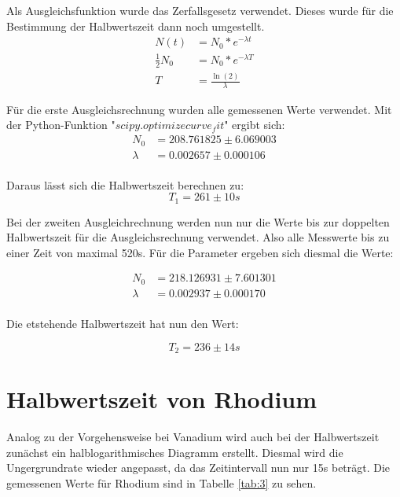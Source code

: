 \documentclass[titlepage=firstcover, captions=tableheading]{scrartcl}
\begin{document}
\noindent Als Ausgleichsfunktion wurde das Zerfallsgesetz verwendet.
Dieses wurde für die Bestimmung der Halbwertszeit dann noch umgestellt.
\begin{align}
    N(t) &= N_0 * e^{-\lambda t} \nonumber \\
    \frac{1}{2} N_0 &= N_0 * e^{-\lambda T} \nonumber \\
    T &= \frac{\ln(2)}{\lambda} \nonumber
\end{align}

\noindent Für die erste Ausgleichsrechnung wurden alle gemessenen Werte verwendet.
Mit der Python-Funktion "$scipy.optimize curve_fit$" ergibt sich:
\begin{align}
    N_0 &=  208.761825 \pm 6.069003 \nonumber \\
    \lambda &= 0.002657 \pm 0.000106 \nonumber\\ 
\end{align}

Daraus lässt sich die Halbwertszeit berechnen zu:
\begin{displaymath}
    T_1 = 261 \pm 10 s 
\end{displaymath}

Bei der zweiten Ausgleichrechnung werden nun nur die Werte bis zur doppelten Halbwertszeit für die Ausgleichsrechnung verwendet.
Also alle Messwerte bis zu einer Zeit von maximal 520s.
Für die Parameter ergeben sich diesmal die Werte:

\begin{align}
    N_0 &=  218.126931 \pm 7.601301 \nonumber \\
    \lambda &= 0.002937 \pm 0.000170 \nonumber\\ 
\end{align}

Die etstehende Halbwertszeit hat nun den Wert:

\begin{displaymath}
    T_2 = 236 \pm 14 s 
\end{displaymath}

\section{Halbwertszeit von Rhodium}

Analog zu der Vorgehensweise bei Vanadium wird auch bei der Halbwertszeit zunächst ein halblogarithmisches Diagramm erstellt.
Diesmal wird die Ungergrundrate wieder angepasst, da das Zeitintervall nun nur 15s beträgt.
Die gemessenen Werte für Rhodium sind in Tabelle \ref{tab:3} zu sehen.
\end{document}
